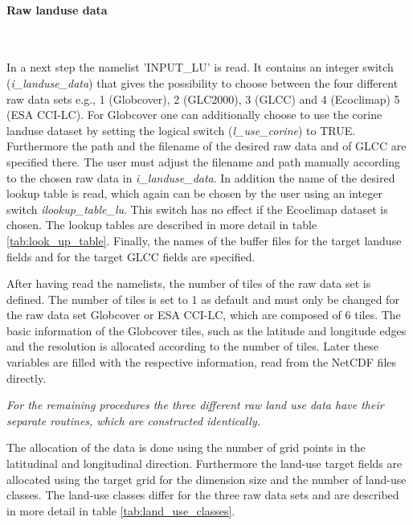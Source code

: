 \documentclass[a4paper,10pt,DIV14,BCOR1cm,titlepage,twoside]{scrartcl}
\begin{document}
\paragraph{Raw landuse data} \ \par\medskip\noindent
In a next step the namelist 'INPUT\_LU' is read. It contains an integer switch (\textit{i\_landuse\_data}) that gives the possibility to choose between the four different raw data sets e.g., 1 (Globcover), 2 (GLC2000), 3 (GLCC) and 4 (Ecoclimap) 5 (ESA CCI-LC). For Globcover one can additionally choose to use the corine landuse dataset by setting the logical switch (\textit{l\_use\_corine}) to TRUE.  Furthermore the path and the filename of the desired raw data and of GLCC are specified there. The user must adjust the filename and path manually according to the chosen raw data in \textit{i\_landuse\_data}. In addition the name of the desired lookup table is read, which again can be chosen by the user using an integer switch \textit{ilookup\_table\_lu}. This switch has no effect if the Ecoclimap dataset is chosen. The lookup tables are described in more detail in table \ref{tab:look_up_table}. Finally, the names of the buffer files for the target landuse fields and for the target GLCC fields are specified. \par\medskip\noindent
After having read the namelists, the number of tiles of the raw data set is defined. The number of tiles is set to 1 as default and must only be changed for the raw data set Globcover or ESA CCI-LC, which are composed of 6 tiles. The basic information of the Globcover tiles, such as the latitude and longitude edges and the resolution is allocated according to the number of tiles. Later these variables are filled with the respective information, read from the NetCDF files directly. \par\medskip\noindent
\textit{For the remaining procedures the three different raw land use data have their separate routines, which are constructed identically.}  \par\medskip\noindent
The allocation of the data is done using the number of grid points in the latitudinal and longitudinal direction. Furthermore the land-use target fields are allocated using the target grid for the dimension size and the number of land-use classes. The land-use classes differ for the three raw data sets and are described in more detail in table \ref{tab:land_use_classes}. \par\medskip\noindent
\end{document}
